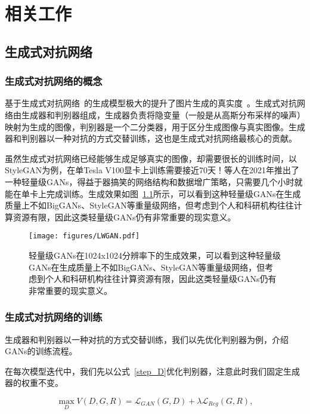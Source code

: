 \chapter{相关工作}

\section{生成式对抗网络}

\subsection{生成式对抗网络的概念}

基于生成式对抗网络~\cite{GANs}的生成模型极大的提升了图片生成的真实度~\cite{BigGANs,StyleGAN}。生成式对抗网络由生成器和判别器组成，生成器负责将隐变量（一般是从高斯分布采样的噪声）映射为生成的图像，判别器是一个二分类器，用于区分生成图像与真实图像。生成器和判别器以一种对抗的方式交替训练，这也是生成式对抗网络最核心的贡献。

虽然生成式对抗网络已经能够生成足够真实的图像，却需要很长的训练时间，以StyleGAN为例，在单Tesla V100显卡上训练需要接近70天！等人在2021年推出了一种轻量级GANs，得益于器搞笑的网络结构和数据增广策略，只需要几个小时就能在单卡上完成训练。生成效果如图~\ref{LWGAN}所示，可以看到这种轻量级GANs在生成质量上不如BigGANs、StyleGAN等重量级网络，但考虑到个人和科研机构往往计算资源有限，因此这类轻量级GANs仍有非常重要的现实意义。

\begin{figure}
    \centering
    \texttt{[image: figures/LWGAN.pdf]}
    \caption{轻量级GANs在1024x1024分辨率下的生成效果，可以看到这种轻量级GANs在生成质量上不如BigGANs、StyleGAN等重量级网络，但考虑到个人和科研机构往往计算资源有限，因此这类轻量级GANs仍有非常重要的现实意义。}
    \label{LWGAN}
\end{figure}

\subsection{生成式对抗网络的训练}

生成器和判别器以一种对抗的方式交替训练，我们以先优化判别器为例，介绍GANs的训练流程。

在每次模型迭代中，我们先以公式~\ref{step_D}优化判别器，注意此时我们固定生成器的权重不变。

\begin{equation}
    \max _{D} V(D, G, R) = \mathcal{L}_{GAN}(G, D) + \lambda \mathcal{L}_{Reg}(G, R),
    \label{step_D}
\end{equation}

